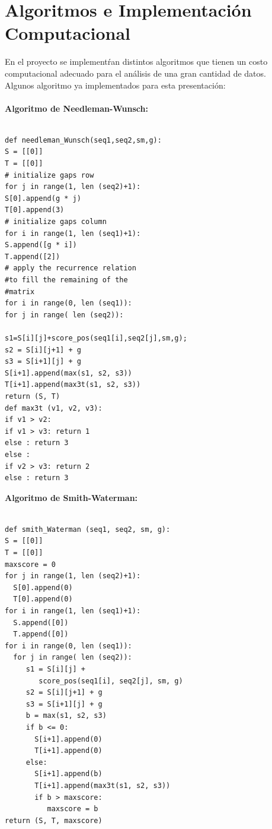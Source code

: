 \documentclass[twocolumn,twoside,12pt]{article}
\begin{document}
\begin{itemize}
\begin{itemize}
\end{itemize}



\section{Algoritmos e Implementaci\'on Computacional}


En el proyecto se implement\'ran distintos algoritmos que tienen un costo computacional adecuado para el an\'alisis de una gran cantidad de datos.\\

Algunos algoritmo ya implementados para esta presentaci\'on:\\
\\

\textbf{Algoritmo de Needleman-Wunsch:}
\footnotesize
\begin{lstlisting}[frame=single]

def needleman_Wunsch(seq1,seq2,sm,g):
S = [[0]]
T = [[0]]
# initialize gaps row
for j in range(1, len (seq2)+1):
S[0].append(g * j)
T[0].append(3)
# initialize gaps column
for i in range(1, len (seq1)+1):
S.append([g * i])
T.append([2])
# apply the recurrence relation 
#to fill the remaining of the
#matrix
for i in range(0, len (seq1)):
for j in range( len (seq2)):

s1=S[i][j]+score_pos(seq1[i],seq2[j],sm,g);
s2 = S[i][j+1] + g
s3 = S[i+1][j] + g
S[i+1].append(max(s1, s2, s3))
T[i+1].append(max3t(s1, s2, s3))
return (S, T)
def max3t (v1, v2, v3):
if v1 > v2:
if v1 > v3: return 1
else : return 3
else :
if v2 > v3: return 2
else : return 3

\end{lstlisting}
\normalsize
\textbf{Algoritmo de Smith-Waterman:}
\footnotesize
\begin{lstlisting}[frame=single]

def smith_Waterman (seq1, seq2, sm, g):
S = [[0]]
T = [[0]]
maxscore = 0
for j in range(1, len (seq2)+1):
  S[0].append(0)
  T[0].append(0)
for i in range(1, len (seq1)+1):
  S.append([0])
  T.append([0])
for i in range(0, len (seq1)):
  for j in range( len (seq2)):
     s1 = S[i][j] + 
        score_pos(seq1[i], seq2[j], sm, g)
     s2 = S[i][j+1] + g
     s3 = S[i+1][j] + g
     b = max(s1, s2, s3)
     if b <= 0:
       S[i+1].append(0)
       T[i+1].append(0)
     else:
       S[i+1].append(b)
       T[i+1].append(max3t(s1, s2, s3))
       if b > maxscore:
          maxscore = b
return (S, T, maxscore)

\end{lstlisting}
\normalsize


\end{itemize}
\end{document}
